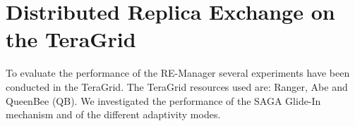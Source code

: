 \documentclass{rspublic}
\newcommand{\replicaagent}[1]{Replica-Agent }
\begin{document}
% 
% 
% 
% 






\section{Distributed Replica Exchange on the TeraGrid}
\label{sec:exp}
        
To evaluate the performance of the RE-Manager several experiments have
been conducted in the TeraGrid. The TeraGrid resources used are: 
Ranger, Abe and QueenBee (QB). 
We investigated the performance of the SAGA Glide-In mechanism 
and of the different adaptivity modes.
\end{document}
